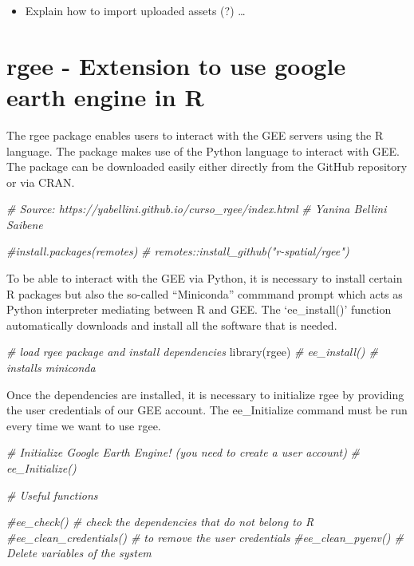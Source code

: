 \documentclass[
  10pt,
  b5paper,
  oneside]{book}
\newenvironment{Shaded}{\begin{snugshade}}{\end{snugshade}}
\newcommand{\CommentTok}[1]{\textcolor[rgb]{0.56,0.35,0.01}{\textit{#1}}}
\newcommand{\FunctionTok}[1]{\textcolor[rgb]{0.00,0.00,0.00}{#1}}
\newcommand{\NormalTok}[1]{#1}
\providecommand{\tightlist}{%
  \setlength{\itemsep}{0pt}\setlength{\parskip}{0pt}}
\begin{document}
\begin{itemize}
\tightlist
\item
  Explain how to import uploaded assets (?) \ldots{}
\end{itemize}

\hypertarget{rgee---extension-to-use-google-earth-engine-in-r}{%
\section{rgee - Extension to use google earth engine in R}\label{rgee---extension-to-use-google-earth-engine-in-r}}

The rgee package enables users to interact with the GEE servers using the R language. The package makes use of the Python language to interact with GEE. The package can be downloaded easily either directly from the GitHub repository or via CRAN.

\begin{Shaded}
\begin{Highlighting}[]
\CommentTok{\# Source: https://yabellini.github.io/curso\_rgee/index.html}
\CommentTok{\# Yanina Bellini Saibene}

\CommentTok{\#install.packages(\textquotesingle{}remotes\textquotesingle{})}
\CommentTok{\# remotes::install\_github("r{-}spatial/rgee")}
\end{Highlighting}
\end{Shaded}

To be able to interact with the GEE via Python, it is necessary to install certain R packages but also the so-called ``Miniconda'' commmand prompt which acts as Python interpreter mediating between R and GEE. The `ee\_install()' function automatically downloads and install all the software that is needed.

\begin{Shaded}
\begin{Highlighting}[]
\CommentTok{\# load rgee package and install dependencies}
\FunctionTok{library}\NormalTok{(rgee)}
\CommentTok{\# ee\_install() \# installs miniconda}
\end{Highlighting}
\end{Shaded}

Once the dependencies are installed, it is necessary to initialize rgee by providing the user credentials of our GEE account. The ee\_Initialize command must be run every time we want to use rgee.

\begin{Shaded}
\begin{Highlighting}[]
\CommentTok{\# Initialize Google Earth Engine! (you need to create a user account)}
\CommentTok{\# ee\_Initialize()}


\CommentTok{\# Useful functions}

\CommentTok{\#ee\_check() \# check the dependencies that do not belong to R}
\CommentTok{\#ee\_clean\_credentials() \# to remove the user credentials}
\CommentTok{\#ee\_clean\_pyenv() \# Delete variables of the system}
\end{Highlighting}
\end{Shaded}
\end{document}
